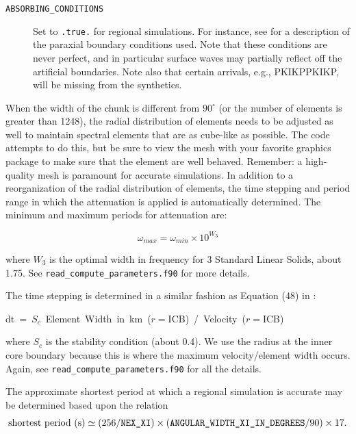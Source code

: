 \documentclass[oneside,english]{book}
\newenvironment{lyxcode}
{\begin{list}{}{
\setlength{\rightmargin}{\leftmargin}
\setlength{\listparindent}{0pt}%
\raggedright
\setlength{\itemsep}{0pt}
\setlength{\parsep}{0pt}
\normalfont\ttfamily}%
 \item[]}
{\end{list}}
\newcommand{\nexxi}{\mbox{\texttt{NEX\_XI}}}
\begin{document}
\begin{description}
\item [{\texttt{ABSORBING\_CONDITIONS}}] Set to \texttt{.true.}{\small{}
}for regional simulations. For instance, see \citet{KoTr99} for a
description of the paraxial boundary conditions used. Note that these
conditions are never perfect, and in particular surface waves may
partially reflect off the artificial boundaries. Note also that certain
arrivals, e.g., PKIKPPKIKP, will be missing from the synthetics.
\end{description}
When the width of the chunk is different from $90^{\circ}$ (or the
number of elements is greater than 1248), the radial distribution
of elements needs to be adjusted as well to maintain spectral elements
that are as cube-like as possible. The code attempts to do this, but
be sure to view the mesh with your favorite graphics package to make
sure that the element are well behaved.
Remember: a high-quality mesh is paramount for accurate simulations.
In addition to a reorganization of the radial distribution of elements,
the time stepping and period range in which the attenuation is applied
is automatically determined. The minimum and maximum periods for attenuation
are:

\[
\omega_{max}=\omega_{min}\times10^{W_{3}}\]


\noindent where $W_{3}$ is the optimal width in frequency for 3 Standard
Linear Solids, about 1.75. See \texttt{\small read\_compute\_parameters.f90}
for more details.

The time stepping is determined in a similar fashion as Equation (48)
in \citet{KoTr02a}:

\begin{lyxcode}
dt~=~$S_{c}$~Element~Width~in~km~($r=$ICB)~/~Velocity~($r=$ICB)
\end{lyxcode}
where $S_{c}$ is the stability condition (about 0.4). We use the
radius at the inner core boundary because this is where the maximum
velocity/element width occurs. Again, see \texttt{\small read\_compute\_parameters}\texttt{.f90}
for all the details.

The approximate shortest period at which a regional simulation is
accurate may be determined based upon the relation \begin{equation}
\mbox{shortest period (s)}\simeq(256/\nexxi)\times(\texttt{ANGULAR\_WIDTH\_XI\_IN\_DEGREES}/90)\times17.\label{eq:shortest_period_regional}\end{equation}
\end{document}
